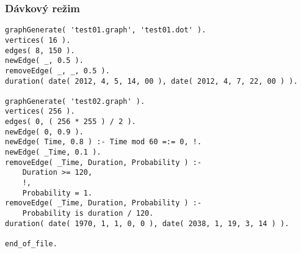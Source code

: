 \documentclass[11pt, a4paper]{article}
\theoremstyle{plain}
\theoremstyle{definition}
\theoremstyle{remark}
\begin{document}
\subsubsection{Dávkový režim}

\begin{lstlisting}[firstnumber=1]
% gen_graph.pl
graphGenerate( 'test01.graph', 'test01.dot' ).
vertices( 16 ).
edges( 8, 150 ).
newEdge( _, 0.5 ).
removeEdge( _, _, 0.5 ).
duration( date( 2012, 4, 5, 14, 00 ), date( 2012, 4, 7, 22, 00 ) ).

graphGenerate( 'test02.graph' ).
vertices( 256 ).
edges( 0, ( 256 * 255 ) / 2 ).
newEdge( 0, 0.9 ).
newEdge( Time, 0.8 ) :- Time mod 60 =:= 0, !.
newEdge( _Time, 0.1 ).
removeEdge( _Time, Duration, Probability ) :-
    Duration >= 120,
    !,
    Probability = 1.
removeEdge( _Time, Duration, Probability ) :-
    Probability is duration / 120.
duration( date( 1970, 1, 1, 0, 0 ), date( 2038, 1, 19, 3, 14 ) ).

end_of_file.
\end{lstlisting}
\end{document}
